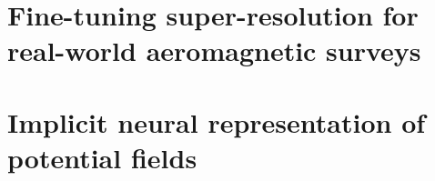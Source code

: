 \documentclass[12pt,a4paper,notitlepage]{report} %
\begin{document}
\chapter[Fine-tuning SR for real-world aeromagnetic surveys]{Fine-tuning super-resolution for real-world aeromagnetic surveys}
\label{ch:paper2}


\chapter[Implicit neural representation of potential fields]{Implicit neural representation of potential fields}
\label{ch:paper3}




\printbibliography{}
\end{document}
